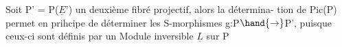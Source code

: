 Soit P' = P($\underline{E}$') un deuxième fibré projectif, alors la détermina-%
tion de Pic(P) permet en prihcipe de déterminer les S-morphismes
g:P$\hand{\to}$P', puisque ceux-ci sont définis par un Module inversible $\underline{L}$  sur P\margin{\ensuremath{/}}


